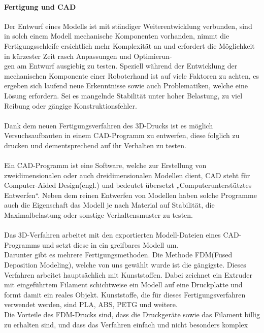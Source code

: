 \documentclass[titlepage,12pt,twoside]{article}
\begin{document}
\paragraph{Fertigung und CAD}
\label{par:Fertigung und CAD}
\hfill \break
\hfill \break
Der Entwurf eines Modells ist mit ständiger Weiterentwicklung verbunden, sind in 
solch einem Modell mechanische Komponenten vorhanden, nimmt die Fertigungsschleife 
ersichtlich mehr Komplexität an und erfordert die Möglichkeit in kürzester Zeit 
rasch Anpassungen und Optimierun-\\gen am Entwurf ausgiebig zu testen. Speziell 
während der Entwicklung der mechanischen Komponente einer Roboterhand ist auf 
viele Faktoren zu achten, es ergeben sich laufend neue Erkenntnisse sowie auch 
Problematiken, welche eine Lösung erfordern. Sei es mangelnde Stabilität unter 
hoher Belastung, zu viel Reibung oder gängige Konstruktionsfehler. \\
\\
Dank dem neuen Fertigungsverfahren des 3D-Drucks ist es möglich Versuchsaufbauten 
in einem CAD-Programm zu entwerfen, diese folglich zu drucken und dementsprechend 
auf ihr Verhalten zu testen. \\
\\
Ein CAD-Programm ist eine Software, welche zur Erstellung von zweidimensionalen 
oder auch dreidimensionalen Modellen dient, CAD steht für Computer-Aided 
Design(engl.) und bedeutet übersetzt „Computerunterstütztes Entwerfen“. Neben 
dem reinen Entwerfen von Modellen haben solche Programme auch die Eigenschaft 
das Modell je nach Material auf Stabilität, die Maximalbelastung oder sonstige 
Verhaltensmuster zu testen. \\
\\
Das 3D-Verfahren arbeitet mit den exportierten Modell-Dateien eines CAD-Programms 
und setzt diese in ein greifbares Modell um. \\
Darunter gibt es mehrere Fertigungsmethoden. Die Methode FDM(Fused Deposition Modeling), welche von uns gewählt wurde ist die 
gängigste. Dieses Verfahren arbeitet hauptsächlich 
mit Kunststoffen. Dabei zeichnet ein Extruder mit eingeführtem Filament schichtweise 
ein Modell auf eine Druckplatte und formt damit ein reales Objekt. Kunststoffe, 
die für dieses Fertigungsverfahren verwendet werden, sind PLA, ABS, PETG und weitere. \\
Die Vorteile des FDM-Drucks sind, dass die Druckgeräte sowie das Filament billig 
zu erhalten sind, und dass das Verfahren einfach und nicht besonders komplex 
\end{document}
